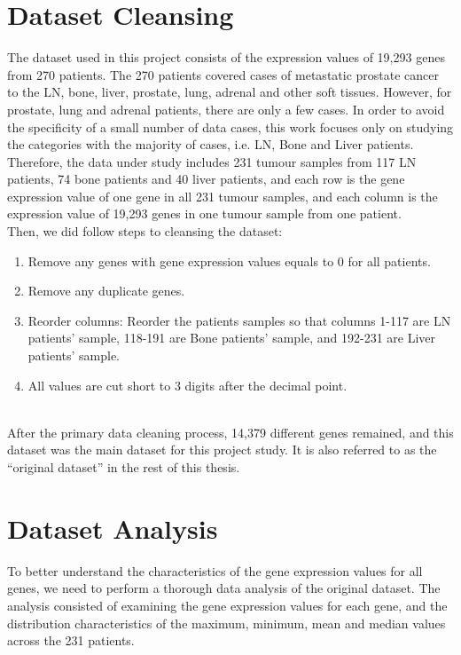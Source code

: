 \documentclass[12pt,a4paper]{report}
\begin{document}
\section{Dataset Cleansing}
The dataset used in this project consists of the expression values of 19,293 genes from 270 patients. The 270 patients covered cases of metastatic prostate cancer to the LN, bone, liver, prostate, lung, adrenal and other soft tissues. However, for prostate, lung and adrenal patients, there are only a few cases. In order to avoid the specificity of a small number of data cases, this work focuses only on studying the categories with the majority of cases, i.e. LN, Bone and Liver patients. Therefore, the data under study includes 231 tumour samples from 117 LN patients, 74 bone patients and 40 liver patients, and each row is the gene expression value of one gene in all 231 tumour samples, and each column is the expression value of 19,293 genes in one tumour sample from one patient.\\

Then, we did follow steps to cleansing the dataset:

\begin{enumerate}[\hspace{3em}a.]
\item Remove any genes with gene expression values equals to 0 for all patients. 
\item   Remove any duplicate genes.
\item Reorder columns: Reorder the patients samples so that columns 1-117 are LN patients’ sample, 118-191 are Bone patients’ sample, and 192-231 are Liver patients’ sample.
\item All values are cut short to 3 digits after the decimal point.
\end{enumerate}\\

After the primary data cleaning process, 14,379 different genes remained, and this dataset was the main dataset for this project study. It is also referred to as the “original dataset” in the rest of this thesis.

\section{Dataset Analysis}
To better understand the characteristics of the gene expression values for all genes, we need to perform a thorough data analysis of the original dataset. The analysis consisted of examining the gene expression values for each gene, and the distribution characteristics of the maximum, minimum, mean and median values across the 231 patients.\\
\end{document}
